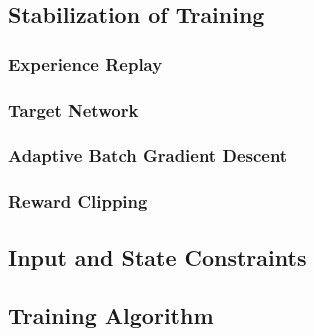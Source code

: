 \subsection{Stabilization of Training}
\subsubsection{Experience Replay}
\subsubsection{Target Network}
\subsubsection{Adaptive Batch Gradient Descent}
\subsubsection{Reward Clipping}
\subsection{Input and State Constraints}
\subsection{Training Algorithm}

